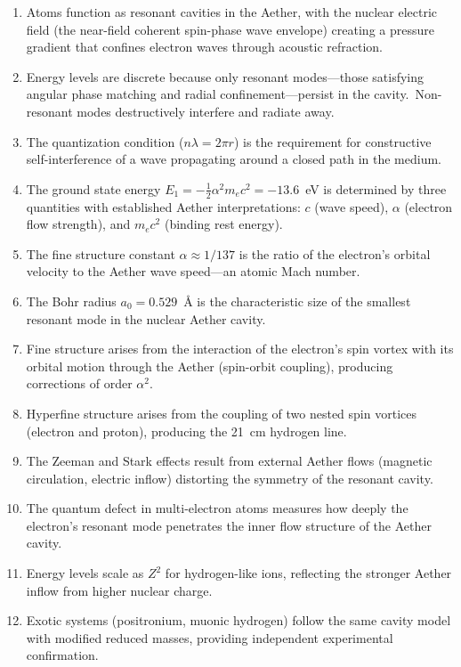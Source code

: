 ﻿\documentclass[12pt,letterpaper]{article}
\begin{document}
\begin{enumerate}[leftmargin=2em]
  \item Atoms function as resonant cavities in the Aether, with the nuclear electric field
    (the near-field coherent spin-phase wave envelope) creating a pressure gradient
    that confines electron waves through acoustic refraction.
  \item Energy levels are discrete because only resonant modes---those satisfying angular
    phase matching and radial confinement---persist in the cavity.\ Non-resonant modes
    destructively interfere and radiate away.
  \item The quantization condition ($n\lambda = 2\pi r$) is the requirement for
    constructive self-interference of a wave propagating around a closed path in the
    medium.
  \item The ground state energy $E_1 = -\frac{1}{2}\alpha^2 m_e c^2 = -13.6$~eV is
    determined by three quantities with established Aether interpretations: $c$ (wave
    speed), $\alpha$ (electron flow strength), and $m_e c^2$ (binding rest energy).
  \item The fine structure constant $\alpha \approx 1/137$ is the ratio of the electron's
    orbital velocity to the Aether wave speed---an atomic Mach number.
  \item The Bohr radius $a_0 = 0.529$~\AA{} is the characteristic size of the smallest
    resonant mode in the nuclear Aether cavity.
  \item Fine structure arises from the interaction of the electron's spin vortex with
    its orbital motion through the Aether (spin-orbit coupling), producing corrections
    of order $\alpha^2$.
  \item Hyperfine structure arises from the coupling of two nested spin vortices
    (electron and proton), producing the 21~cm hydrogen line.
  \item The Zeeman and Stark effects result from external Aether flows (magnetic
    circulation, electric inflow) distorting the symmetry of the resonant cavity.
  \item The quantum defect in multi-electron atoms measures how deeply the electron's
    resonant mode penetrates the inner flow structure of the Aether cavity.
  \item Energy levels scale as $Z^2$ for hydrogen-like ions, reflecting the stronger
    Aether inflow from higher nuclear charge.
  \item Exotic systems (positronium, muonic hydrogen) follow the same cavity model with
    modified reduced masses, providing independent experimental confirmation.
\end{enumerate}
\end{document}

